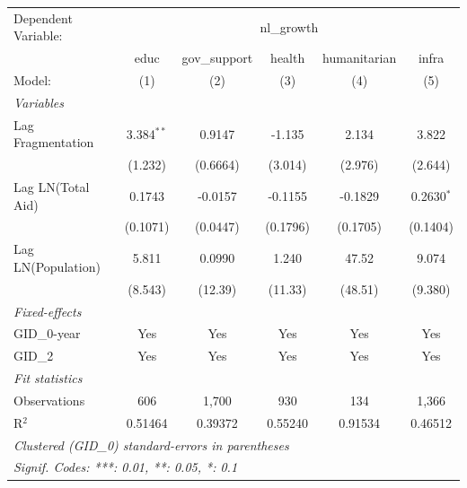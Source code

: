 \begingroup
\centering
\begin{tabular}{lccccc}
   \tabularnewline \midrule \midrule
   Dependent Variable: & \multicolumn{5}{c}{nl\_growth}\\
                      & educ         & gov\_support  & health   & humanitarian & infra \\   
   Model:             & (1)          & (2)           & (3)      & (4)          & (5)\\  
   \midrule
   \emph{Variables}\\
   Lag Fragmentation  & 3.384$^{**}$ & 0.9147        & -1.135   & 2.134        & 3.822\\   
                      & (1.232)      & (0.6664)      & (3.014)  & (2.976)      & (2.644)\\   
   Lag LN(Total Aid)  & 0.1743       & -0.0157       & -0.1155  & -0.1829      & 0.2630$^{*}$\\   
                      & (0.1071)     & (0.0447)      & (0.1796) & (0.1705)     & (0.1404)\\   
   Lag LN(Population) & 5.811        & 0.0990        & 1.240    & 47.52        & 9.074\\   
                      & (8.543)      & (12.39)       & (11.33)  & (48.51)      & (9.380)\\   
   \midrule
   \emph{Fixed-effects}\\
   GID\_0-year        & Yes          & Yes           & Yes      & Yes          & Yes\\  
   GID\_2             & Yes          & Yes           & Yes      & Yes          & Yes\\  
   \midrule
   \emph{Fit statistics}\\
   Observations       & 606          & 1,700         & 930      & 134          & 1,366\\  
   R$^2$              & 0.51464      & 0.39372       & 0.55240  & 0.91534      & 0.46512\\  
   \midrule \midrule
   \multicolumn{6}{l}{\emph{Clustered (GID\_0) standard-errors in parentheses}}\\
   \multicolumn{6}{l}{\emph{Signif. Codes: ***: 0.01, **: 0.05, *: 0.1}}\\
\end{tabular}
\par\endgroup



